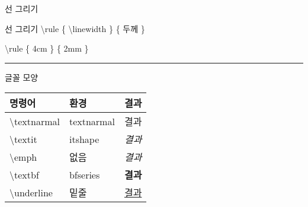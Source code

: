 \documentclass[ aspectratio=149,  10pt,blue,xcolor=pdftex,dvipsnames,table,handout,notes]{beamer}
\begin{document}
		\begin{frame}[t]{선 그리기}

			\begin{block} {선 그리기}
			\textbackslash rule \{ \textbackslash linewidth \} \{ 두께 \}
			\end{block}

			\begin{example}
			\textbackslash rule \{ 4cm \} \{ 2mm \}
			\end{example}

			\rule{4cm}{2mm}

		\note[item]{}
		\end{frame}









		\begin{frame}[t,allowframebreaks]{글꼴 모양}

			\begin{table}
			\begin{tabular}{ l l l  }
				명령어	&환경	&결과\\
				\hline
				\textbackslash textnarmal 	&textnarmal 	&\textnormal{결과}\\
				\textbackslash textit 		&itshape		&\textit{결과}\\
				\textbackslash emph 		&없음		&\emph{결과}\\
				\textbackslash textbf 		&bfseries		&\textbf{결과}\\
				\textbackslash underline 	&밑줄		&\underline{결과}\\
			\end{tabular}
			\end{table}

		\note[item]{}
		\end{frame}




\end{document}
